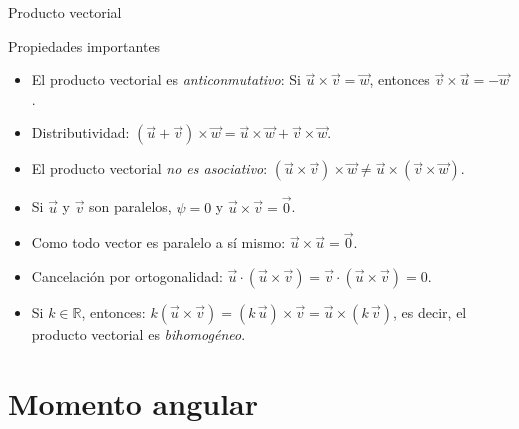 \documentclass[11pt,handout,aspectratio=1610]{beamer}
\newcommand{\rr}{\mathbb{R}}
\begin{document}
\begin{frame}{Producto vectorial}

    \begin{block}{Propiedades importantes}
        \begin{itemize}
            \item El producto vectorial es \emph{anticonmutativo}: Si $\vec{u} \times \vec{v} = \vec{w}$, entonces $\vec {v} \times \vec{u} = - \vec{w}$.
            \item Distributividad: $\left(\vec{u} + \vec{v}\right) \times \vec{w} = \vec{u} \times \vec{w} + \vec{v} \times \vec{w}$.
            \item El producto vectorial \emph{no es asociativo}: $\left(\vec{u} \times \vec{v}\right) \times \vec{w} \neq \vec{u} \times \left(\vec{v} \times \vec{w}\right)$.
            \item Si $\vec{u}$ y $\vec{v}$ son paralelos, $\psi = 0$ y $\vec{u} \times \vec{v} = \vec{0}$.
            \item Como todo vector es paralelo a sí mismo: $\vec{u} \times \vec{u} = \vec{0}$.
            \item Cancelación por ortogonalidad: $\vec{u} \cdot \left(\vec{u} \times \vec{v}\right) = \vec{v} \cdot \left(\vec{u} \times \vec{v}\right) = 0$.
            \item Si $k \in \rr$, entonces: $k \left(\vec{u} \times \vec{v}\right) = \left(k \, \vec{u}\right) \times \vec{v} = \vec{u} \times \left(k \, \vec{v}\right)$, es decir, el producto vectorial es \emph{bihomogéneo}.
        \end{itemize}
    \end{block}

\end{frame}

\section{Momento angular}
\end{document}
